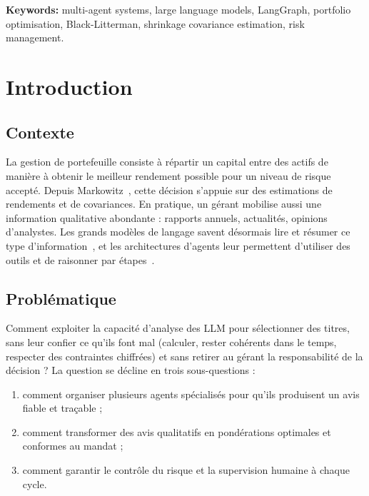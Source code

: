 \documentclass[11pt,a4paper]{report}
\begin{document}
\medskip\noindent\textbf{Keywords:} multi-agent systems, large language models, LangGraph, portfolio optimisation,
Black-Litterman, shrinkage covariance estimation, risk management.

\tableofcontents
\listoffigures
\listoftables

\cleardoublepage
{}

\chapter{Introduction}

\section{Contexte}
La gestion de portefeuille consiste à répartir un capital entre des actifs de manière à obtenir le meilleur
rendement possible pour un niveau de risque accepté. Depuis Markowitz~\cite{markowitz}, cette décision
s'appuie sur des estimations de rendements et de covariances. En pratique, un gérant mobilise aussi une
information qualitative abondante : rapports annuels, actualités, opinions d'analystes. Les grands modèles
de langage savent désormais lire et résumer ce type d'information~\cite{finbert,bloomberggpt}, et les
architectures d'agents leur permettent d'utiliser des outils et de raisonner par étapes~\cite{react}.

\section{Problématique}
Comment exploiter la capacité d'analyse des LLM pour sélectionner des titres, sans leur confier ce qu'ils
font mal (calculer, rester cohérents dans le temps, respecter des contraintes chiffrées) et sans retirer au
gérant la responsabilité de la décision ? La question se décline en trois sous-questions :
\begin{enumerate}
  \item comment organiser plusieurs agents spécialisés pour qu'ils produisent un avis fiable et traçable ;
  \item comment transformer des avis qualitatifs en pondérations optimales et conformes au mandat ;
  \item comment garantir le contrôle du risque et la supervision humaine à chaque cycle.
\end{enumerate}
\end{document}

